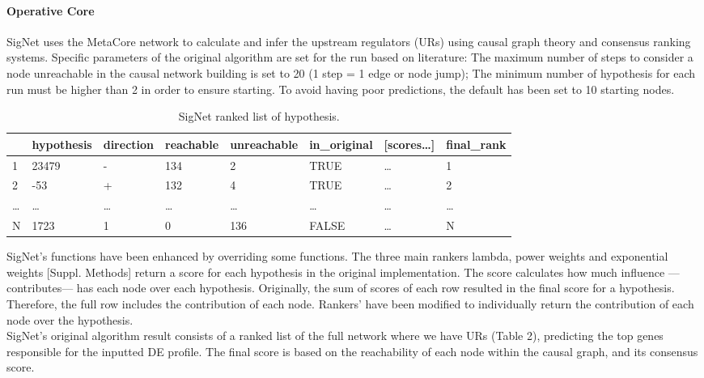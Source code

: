 \paragraph{Operative Core}
SigNet uses the MetaCore network to calculate and infer the upstream regulators (URs) using causal graph theory and consensus ranking systems. Specific parameters of the original algorithm are set for the run based on literature: The maximum number of steps to consider a node unreachable in the causal network building is set to 20 (1 step = 1 edge or node jump); The minimum number of hypothesis for each run must be higher than 2 in order to ensure starting. To avoid having poor predictions, the default has been set to 10 starting nodes.
\\
\begin{table}[!h]
\begin{tabular}{|l|l|l|l|l|l|l|l|}
\hline
  & hypothesis & direction & reachable & unreachable & in\_original & {[}scores…{]} & final\_rank \\ \hline
1 & 23479      & -         & 134       & 2           & TRUE         & …             & 1           \\ \hline
2 & -53        & +         & 132       & 4           & TRUE         & …             & 2           \\ \hline
… & …          & …         & …         & …           & …            & …             & …           \\ \hline
N & 1723       & 1         & 0         & 136         & FALSE        & …             & N           \\ \hline
\end{tabular}
\caption{SigNet ranked list of hypothesis.}
\label{tbl:signet_output}
\end{table}

SigNet’s functions have been enhanced by overriding some functions. The three main rankers lambda, power weights and exponential weights [Suppl. Methods] return a score for each hypothesis in the original implementation. The score calculates how much influence — contributes— has each node over each hypothesis. Originally, the sum of scores of each row resulted in the final score for a hypothesis. Therefore, the full row includes the contribution of each node. Rankers’ have been modified to individually return the contribution of each node over the hypothesis.
\\

SigNet’s original algorithm result consists of a ranked list of the full network where we have URs (Table 2), predicting the top genes responsible for the inputted DE profile. The final score is based on the reachability of each node within the causal graph, and its consensus score.
\\

